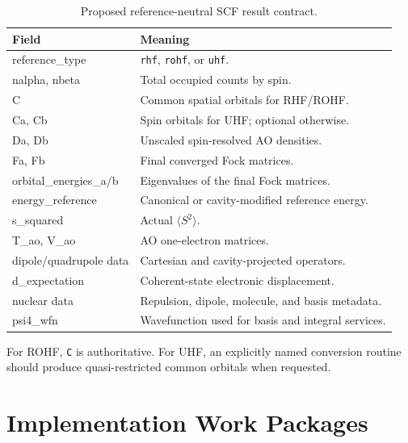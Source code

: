 \documentclass[11pt]{article}
\newcommand{\code}[1]{\texttt{\small #1}}
\begin{document}
\begin{table}[htbp]
\centering
\caption{Proposed reference-neutral SCF result contract.}
\begin{tabularx}{\textwidth}{>{\ttfamily\small}p{} X}
\toprule
Field & Meaning \\
\midrule
reference\_type & \code{rhf}, \code{rohf}, or \code{uhf}. \\
nalpha, nbeta & Total occupied counts by spin. \\
C & Common spatial orbitals for RHF/ROHF. \\
Ca, Cb & Spin orbitals for UHF; optional otherwise. \\
Da, Db & Unscaled spin-resolved AO densities. \\
Fa, Fb & Final converged Fock matrices. \\
orbital\_energies\_a/b & Eigenvalues of the final Fock matrices. \\
energy\_reference & Canonical or cavity-modified reference energy. \\
s\_squared & Actual \(\langle S^2\rangle\). \\
T\_ao, V\_ao & AO one-electron matrices. \\
dipole/quadrupole data & Cartesian and cavity-projected operators. \\
d\_expectation & Coherent-state electronic displacement. \\
nuclear data & Repulsion, dipole, molecule, and basis metadata. \\
psi4\_wfn & Wavefunction used for basis and integral services. \\
\bottomrule
\end{tabularx}
\end{table}

For ROHF, \code{C} is authoritative. For UHF, an explicitly named conversion
routine should produce quasi-restricted common orbitals when requested.

\section{Implementation Work Packages}
\end{document}
